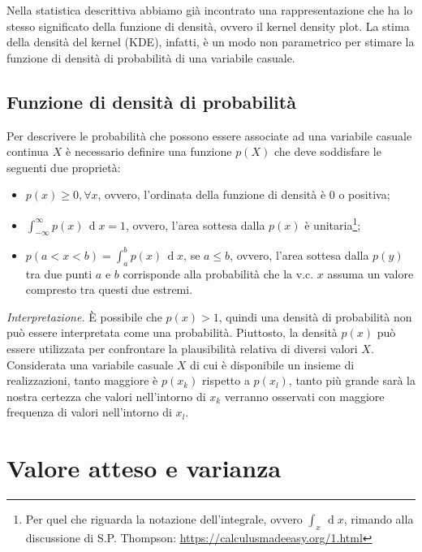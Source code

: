 \documentclass[
  11pt,
]{krantz}
\theoremstyle{definition}
\theoremstyle{definition}
\theoremstyle{definition}
\theoremstyle{definition}
\theoremstyle{remark}
\begin{document}
Nella statistica descrittiva abbiamo già incontrato una rappresentazione che ha lo stesso significato della funzione di densità, ovvero il kernel density plot. La stima della densità del kernel (KDE), infatti, è un modo non parametrico per stimare la funzione di densità di probabilità di una variabile casuale.

\hypertarget{funzione-di-densituxe0-di-probabilituxe0}{%
\section{Funzione di densità di probabilità}\label{funzione-di-densituxe0-di-probabilituxe0}}

Per descrivere le probabilità che possono essere associate ad una variabile casuale continua \(X\) è necessario definire una funzione \(p(X)\) che deve soddisfare le seguenti due proprietà:

\begin{itemize}
\item
  \(p(x) \geq 0, \forall x\), ovvero, l'ordinata della funzione di densità è 0 o positiva;
\item
  \(\int_{-\infty}^{\infty} p(x) \,\operatorname {d}\!x = 1\), ovvero, l'area sottesa dalla \(p(x)\) è unitaria\footnote{Per quel che riguarda la notazione dell'integrale, ovvero \(\int_x \,\operatorname {d}\!x\), rimando alla discussione di S.P. Thompson: \url{https://calculusmadeeasy.org/1.html}};
\item
  \(p(a < x < b) = \int_a^b p(x) \,\operatorname {d}\!x\), se \(a \leq b\), ovvero, l'area sottesa dalla \(p(y)\) tra due punti \(a\) e \(b\) corrisponde alla probabilità che la v.c. \(x\) assuma un valore compresto tra questi due estremi.
\end{itemize}

\emph{Interpretazione.} È possibile che \(p(x) > 1\), quindi una densità di probabilità non può essere interpretata come una probabilità. Piuttosto, la densità \(p(x)\) può essere utilizzata per confrontare la plausibilità relativa di diversi valori \(X\). Considerata una variabile casuale \(X\) di cui è disponibile un insieme di realizzazioni, tanto maggiore è \(p(x_k)\) rispetto a \(p(x_l)\), tanto più grande sarà la nostra certezza che valori nell'intorno di \(x_k\) verranno osservati con maggiore frequenza di valori nell'intorno di \(x_l\).

\hypertarget{exp-val-and-variance-rv}{%
\chapter{Valore atteso e varianza}\label{exp-val-and-variance-rv}}
\end{document}
